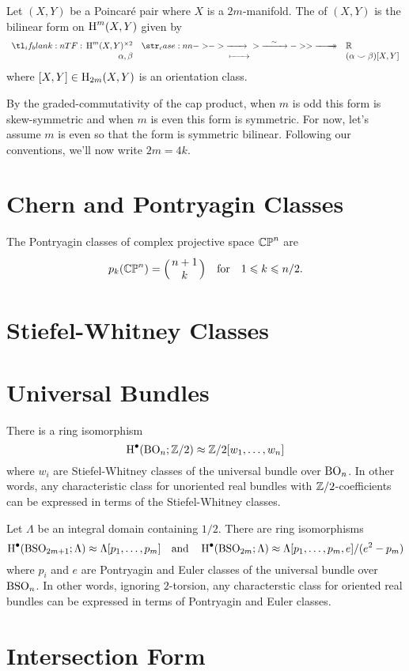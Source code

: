 \begin{definition}\label{defn:intersection-form}
	Let $(X,Y)$ be a Poincar\'e pair where $X$ is a $2m$-manifold. The  of $(X,Y)$ is the bilinear form on $\operatorname{H}^{m}(X,Y)$ given by
	\[
		\lkxfunc{}{\H^{m}(X,Y)^{\times 2}}{\R}{\alpha, \beta}{(\alpha\smile\beta)[X,Y]}
	\]
	where $[X,Y]\in \operatorname{H}_{2m}(X,Y)$ is an orientation class.
\end{definition}
By the graded-commutativity of the cap product, when $m$ is odd this form is skew-symmetric and when $m$ is even this form is symmetric. For now, let's assume $m$ is even so that the form is symmetric bilinear. Following our conventions, we'll now write $2m=4k$. 


\section{Chern and Pontryagin Classes}

\begin{proposition}\label{prop:pontryagin_classes_of_CPn}
  The Pontryagin classes of complex projective space $\mathbb{CP}^n$ are
  \[
    p_k(\CP^n) = \binom{n+1}{k}\quad\textrm{for}\quad 1\leq k \leq n/2.
  \]
\end{proposition}

\section{Stiefel-Whitney Classes}\label{sec:stiefel-whitney_classes}

\section{Universal Bundles}\label{sec:universal_bundles}

\cite{milnorstasheff1974characteristic}
\cite{botttu1982differential}

\begin{theorem}\label{thm:cohomology_of_BO}
  There is a ring isomorphism
  \[
    \operatorname{H}^\bullet({\operatorname{BO}}_n; \mathbb{Z}/2) \approx \mathbb{Z}/2[w_1,\ldots, w_n]
  \]
  where $w_i$ are Stiefel-Whitney classes of the universal bundle over ${\operatorname{BO}}_n$. In other words, any characteristic class for unoriented real bundles with $\mathbb{Z}/2$-coefficients can be expressed in terms of the Stiefel-Whitney classes.
\end{theorem}

\begin{theorem}\label{thm:cohomology_of_BSO}
  Let $\Lambda$ be an integral domain containing $1/2$. There are ring isomorphisms
  \[
      \operatorname{H}^\bullet({\operatorname{BSO}}_{2m+1}; \Lambda) \approx \Lambda[p_1, \ldots, p_m]
      \quad\textrm{and}\quad
      \operatorname{H}^\bullet({\operatorname{BSO}}_{2m}; \Lambda) \approx \Lambda[p_1, \ldots, p_m, e]/(e^2-p_m)
  \]
  where $p_i$ and $e$ are Pontryagin and Euler classes of the universal bundle over ${\operatorname{BSO}}_n$.
  In other words, ignoring $2$-torsion, any characterstic class for oriented real bundles can be expressed in terms of Pontryagin and Euler classes.
\end{theorem}

\section{Intersection Form}

